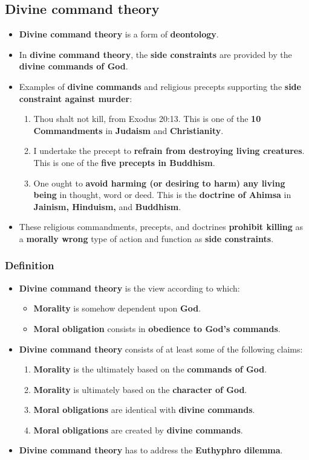 \documentclass[11pt]{article}
\begin{document}
\subsection{Divine command theory}
\label{sec:org877dadf}
\begin{itemize}
\item \textbf{Divine command theory} is a form of \textbf{deontology}.
\item In \textbf{divine command theory}, the \textbf{side constraints} are provided by the \textbf{divine commands of God}.
\item Examples of \textbf{divine commands} and religious precepts supporting the \textbf{side constraint against murder}:
\begin{enumerate}
\item Thou shalt not kill, from Exodus 20:13. This is one of the \textbf{10 Commandments} in \textbf{Judaism} and \textbf{Christianity}.
\item I undertake the precept to \textbf{refrain from destroying living creatures}. This is one of the \textbf{five precepts in Buddhism}.
\item One ought to \textbf{avoid harming (or desiring to harm) any living being} in thought, word or deed. This is the \textbf{doctrine of Ahimsa} in \textbf{Jainism, Hinduism,} and \textbf{Buddhism}.
\end{enumerate}
\item These religious commandments, precepts, and doctrines \textbf{prohibit killing} as a \textbf{morally wrong} type of action and function as \textbf{side constraints}.
\end{itemize}
\subsubsection{Definition}
\label{sec:org04b67f0}
\begin{itemize}
\item \textbf{Divine command theory} is the view according to which:
\begin{itemize}
\item \textbf{Morality} is somehow dependent upon \textbf{God}.
\item \textbf{Moral obligation} consists in \textbf{obedience to God's commands}.
\end{itemize}
\item \textbf{Divine command theory} consists of at least some of the following claims:
\begin{enumerate}
\item \textbf{Morality} is the ultimately based on the \textbf{commands of God}.
\item \textbf{Morality} is ultimately based on the \textbf{character of God}.
\item \textbf{Moral obligations} are identical with \textbf{divine commands}.
\item \textbf{Moral obligations} are created by \textbf{divine commands}.
\end{enumerate}
\item \textbf{Divine command theory} has to address the \textbf{Euthyphro dilemma}.
\end{itemize}
\end{document}
